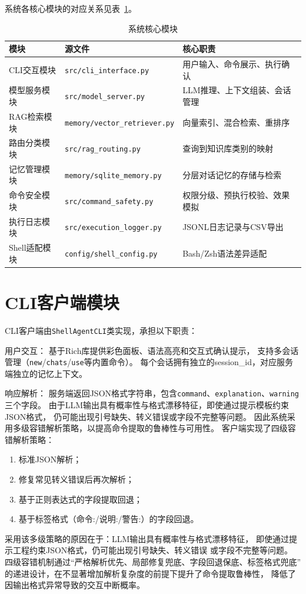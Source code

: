 系统各核心模块的对应关系见表~\ref{tab:modules}。

\begin{table}[htbp]
\centering
\caption{系统核心模块}
\label{tab:modules}
\begin{tabular}{lll}
\toprule
模块 & 源文件 & 核心职责 \\
\midrule
CLI交互模块 & \texttt{src/cli\_interface.py} & 用户输入、命令展示、执行确认 \\
模型服务模块 & \texttt{src/model\_server.py} & LLM推理、上下文组装、会话管理 \\
RAG检索模块 & \texttt{memory/vector\_retriever.py} & 向量索引、混合检索、重排序 \\
路由分类模块 & \texttt{src/rag\_routing.py} & 查询到知识库类别的映射 \\
记忆管理模块 & \texttt{memory/sqlite\_memory.py} & 分层对话记忆的存储与检索 \\
命令安全模块 & \texttt{src/command\_safety.py} & 权限分级、预执行校验、效果模拟 \\
执行日志模块 & \texttt{src/execution\_logger.py} & JSONL日志记录与CSV导出 \\
Shell适配模块 & \texttt{config/shell\_config.py} & Bash/Zsh语法差异适配 \\
\bottomrule
\end{tabular}
\end{table}

\section{CLI客户端模块}

CLI客户端由\texttt{ShellAgentCLI}类实现，承担以下职责：

用户交互：
基于Rich库提供彩色面板、语法高亮和交互式确认提示，
支持多会话管理（\texttt{new}/\texttt{chats}/\texttt{use}等内置命令）。
每个会话拥有独立的session\_id，对应服务端独立的记忆上下文。

响应解析：
服务端返回JSON格式字符串，包含\texttt{command}、\texttt{explanation}、\texttt{warning}三个字段。
由于LLM输出具有概率性与格式漂移特征，即使通过提示模板约束JSON格式，
仍可能出现引号缺失、转义错误或字段不完整等问题。
因此系统采用多级容错解析策略，以提高命令提取的鲁棒性与可用性。
客户端实现了四级容错解析策略：
\begin{enumerate}
    \item 标准JSON解析；
    \item 修复常见转义错误后再次解析；
    \item 基于正则表达式的字段提取回退；
    \item 基于标签格式（命令:/说明:/警告:）的字段回退。
\end{enumerate}
采用该多级策略的原因在于：LLM输出具有概率性与格式漂移特征，
即使通过提示工程约束JSON格式，仍可能出现引号缺失、转义错误
或字段不完整等问题。
四级容错机制通过“严格解析优先、局部修复兜底、字段回退保底、标签格式兜底”
的递进设计，在不显著增加解析复杂度的前提下提升了命令提取鲁棒性，
降低了因输出格式异常导致的交互中断概率。

